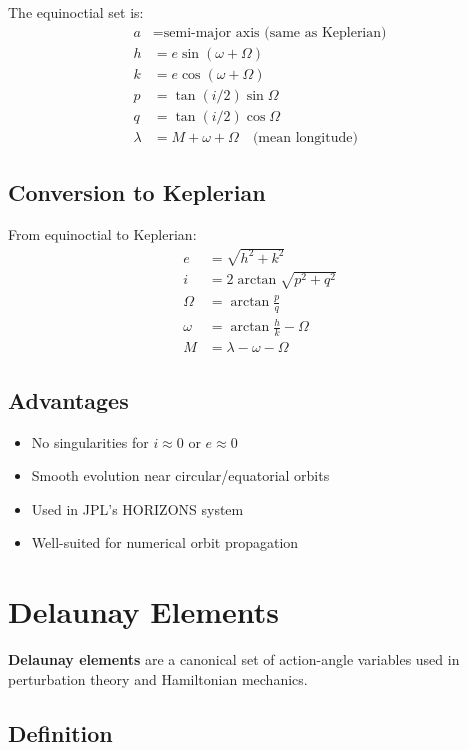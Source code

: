 The equinoctial set is:
\begin{align}
    a &= \text{semi-major axis (same as Keplerian)} \\
    h &= e\sin(\omega + \Omega) \\
    k &= e\cos(\omega + \Omega) \\
    p &= \tan(i/2)\sin\Omega \\
    q &= \tan(i/2)\cos\Omega \\
    \lambda &= M + \omega + \Omega \quad \text{(mean longitude)}
\end{align}

\subsection{Conversion to Keplerian}

From equinoctial to Keplerian:
\begin{align}
    e &= \sqrt{h^2 + k^2} \\
    i &= 2\arctan\sqrt{p^2 + q^2} \\
    \Omega &= \arctan\frac{p}{q} \\
    \omega &= \arctan\frac{h}{k} - \Omega \\
    M &= \lambda - \omega - \Omega
\end{align}

\subsection{Advantages}

\begin{itemize}
    \item No singularities for $i \approx 0$ or $e \approx 0$
    \item Smooth evolution near circular/equatorial orbits
    \item Used in JPL's HORIZONS system
    \item Well-suited for numerical orbit propagation
\end{itemize}

\section{Delaunay Elements}

\textbf{Delaunay elements} are a canonical set of action-angle variables used in perturbation theory and Hamiltonian mechanics.

\subsection{Definition}

